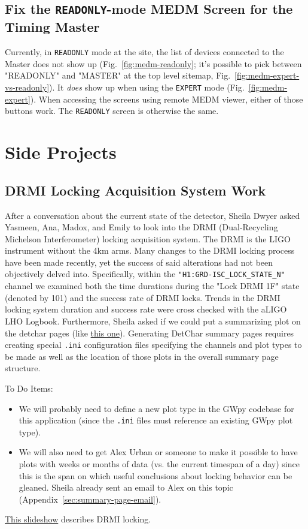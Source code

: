 \documentclass{article}
\newcommand*{\TODO}{\textcolor{todo}}
\begin{document}
\subsection{\label{sec:fix-local-medm-readonly}Fix the \texttt{READONLY}-mode MEDM Screen for the Timing Master}

Currently, in \texttt{READONLY} mode at the site, the list of devices connected to the Master does not show up (Fig.~\ref{fig:medm-readonly}; it's possible to pick between "READONLY" and "MASTER" at the top level sitemap, Fig.~\ref{fig:medm-expert-vs-readonly}). It \textit{does} show up when using the \texttt{EXPERT} mode (Fig.~\ref{fig:medm-expert}). When accessing the screens using remote MEDM viewer, either of those buttons work. The \texttt{READONLY} screen is otherwise the same. 

\section{Side Projects}

\TODO{\subsection{DRMI Locking Acquisition System Work}}

After a conversation about the current state of the detector, Sheila Dwyer asked Yasmeen, Ana, Madox, and Emily to look into the DRMI (Dual-Recycling Michelson Interferometer) locking acquisition system. The DRMI is the LIGO instrument without the 4km arms. Many changes to the DRMI locking process have been made recently, yet the success of said alterations had not been objectively delved into. Specifically, within the \texttt{"H1:GRD-ISC\_LOCK\_STATE\_N"} channel we examined both the time durations during the "Lock DRMI 1F" state (denoted by 101) and the success rate of DRMI locks. Trends in the DRMI locking system duration and success rate were cross checked with the aLIGO LHO Logbook. Furthermore, Sheila asked if we could put a summarizing plot on the detchar pages (like \href{https://ldas-jobs.ligo.caltech.edu/~detchar/summary/day/20190111/psl/}{this one}). Generating DetChar summary pages requires creating special \texttt{.ini} configuration files specifying the channels and plot types to be made as well as the location of those plots in the overall summary page structure.

To Do Items:

\begin{itemize}
    \item \TODO{We will probably need to define a new plot type in the GWpy codebase for this application (since the \texttt{.ini} files must reference an existing GWpy plot type).}
    \item \TODO{We will also need to get Alex Urban or someone to make it possible to have plots with weeks or months of data (vs. the current timespan of a day) since this is the span on which useful conclusions about locking behavior can be gleaned. Sheila already sent an email to Alex on this topic (Appendix~\ref{sec:summary-page-email}).}
\end{itemize}
\href{https://dcc.ligo.org/LIGO-G1301236}{This slideshow} describes DRMI locking.
\end{document}
